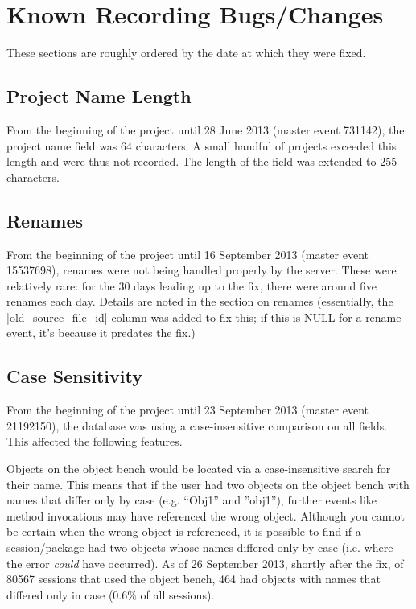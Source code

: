 \documentclass{report}
\begin{document}
\section{Known Recording Bugs/Changes}

These sections are roughly ordered by the date at which they were fixed.

\subsection{Project Name Length}

From the beginning of the project until 28 June 2013 (master event 731142), the project name field was 64 characters.  A small handful of projects exceeded this length and were thus not recorded.  The length of the field was extended to 255 characters.

\subsection{Renames}

From the beginning of the project until 16 September 2013 (master event 15537698), renames were not being handled properly by the server.  These were relatively rare: for the 30 days leading up to the fix, there were around five renames each day.  Details are noted in the section on renames (essentially, the |old_source_file_id| column was added to fix this; if this is NULL for a rename event, it's because it predates the fix.)

\subsection{Case Sensitivity}

From the beginning of the project until 23 September 2013 (master event 21192150), the database was using a case-insensitive comparison on all fields.  This affected the following features.

Objects on the object bench would be located via a case-insensitive search for their name.  This means that if the user had two objects on the object bench with names that differ only by case (e.g. ``Obj1'' and ''obj1''), further events like method invocations may have referenced the wrong object.  Although you cannot be certain when the wrong object is referenced, it is possible to find if a session/package had two objects whose names differed only by case (i.e. where the error \textit{could} have occurred).  As of 26 September 2013, shortly after the fix, of 80567 sessions that used the object bench, 464 had objects with names that differed only in case (0.6\% of all sessions).
\end{document}
